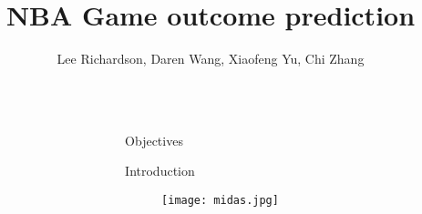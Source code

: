 \documentclass[final]{beamer}
\title{NBA Game outcome prediction}%
\author{Lee Richardson, Daren Wang, Xiaofeng Yu, Chi Zhang} %
\institute{Carnegie Mellon University} %
\newlength{\sepwid}
\newlength{\onecolwid}
\begin{document}

\setlength{\belowcaptionskip}{2ex} %
\setlength\belowdisplayshortskip{2ex} %

\begin{frame}[t] %

\begin{columns}[t] %

\begin{column}{\sepwid}\end{column} %

\begin{column}{\onecolwid} %


\begin{alertblock}{Objectives}


\end{alertblock}


\begin{block}{Introduction}


\end{block}


\begin{figure}\label{midas}
\texttt{[image: midas.jpg]}
\end{figure}


\end{column} %


\end{columns}
\end{frame}
\end{document}
